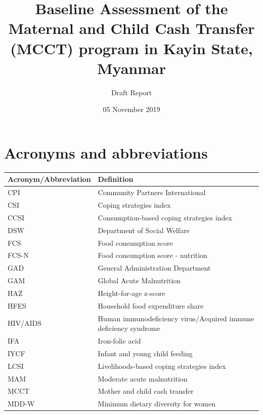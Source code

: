 \documentclass[12pt,a4paper]{article}
\title{\vspace{8cm} \LARGE{Baseline Assessment of the Maternal and Child Cash Transfer (MCCT) program in Kayin State, Myanmar}}
\subtitle{Draft Report}
\author{}
\date{05 November 2019}
\begin{document}
\maketitle

\newpage

{
\hypersetup{linkcolor=black}
\setcounter{tocdepth}{4}
\tableofcontents
}
\listoftables
\listoffigures
\newpage

\hypertarget{acronyms-and-abbreviations}{%
\section*{Acronyms and abbreviations}\label{acronyms-and-abbreviations}}

\begin{table}[H]
\centering
\begin{tabular}{l>{\raggedright\arraybackslash}p{8cm}}
\toprule
\textbf{Acronym/Abbreviation} & \textbf{Definition}\\
\midrule
\rowcolor{gray!6}  CPI & Community Partners International\\
CSI & Coping strategies index\\
\rowcolor{gray!6}  CCSI & Consumption-based coping strategies index\\
DSW & Department of Social Welfare\\
\rowcolor{gray!6}  FCS & Food consumption score\\
\addlinespace
FCS-N & Food consumption score - nutrition\\
\rowcolor{gray!6}  GAD & General Administration Department\\
GAM & Global Acute Malnutrition\\
\rowcolor{gray!6}  HAZ & Height-for-age z-score\\
HFES & Household food expenditure share\\
\addlinespace
\rowcolor{gray!6}  HIV/AIDS & Human immunodeficiency virus/Acquired immune deficiency syndrome\\
IFA & Iron-folic acid\\
\rowcolor{gray!6}  IYCF & Infant and young child feeding\\
LCSI & Livelihoods-based coping strategies index\\
\rowcolor{gray!6}  MAM & Moderate acute malnutrition\\
\addlinespace
MCCT & Mother and child cash transfer\\
\rowcolor{gray!6}  MDD-W & Minimum dietary diversity for women\\

\end{tabular}
\end{table}
\end{document}
